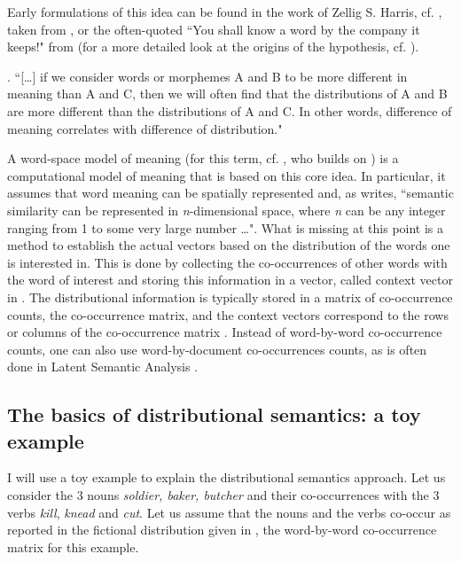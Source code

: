 Early formulations of this idea can be found in the work of Zellig
S. Harris, cf. \Next, taken from \citet{Harris:1954}, or the
often-quoted 
``You shall know a word by the company it keeps!" from
\citet[11]{Firth:1957b} (for a more detailed look at the origins of the
hypothesis, cf. \citealt{Sahlgren:2006,Sahlgren:2008}).

\ex. ``[\dots] if we consider words or morphemes A and B to be more different in
meaning than A and C, then we will often find that the distributions
of A and B are more different than the distributions of A and C.
In other words, difference of meaning correlates with difference of
distribution." %

A word-space model of meaning (for this term,
cf. \citealt[17]{Sahlgren:2006}, who builds on \citealt{Schuetze:1993}) is a computational model of meaning that is
based on this core idea. In particular, it assumes that word meaning
can be spatially represented and, as \citet[18]{Sahlgren:2006}
writes, ``semantic similarity can be represented in
\emph{n}-dimensional space, where \emph{n} can be any integer ranging
from 1 to some very large number \dots". What is missing at this point
is a method to establish the actual vectors based on the distribution
of the words one is interested in. This is done by collecting the
co-occurrences of other words with the word of interest and storing
this information in a vector, called context vector in
\citet[27]{Sahlgren:2006}. The distributional information is typically
stored in a matrix of co-occurrence counts, the co-occurrence matrix,
and the context vectors correspond to the rows or columns of the
co-occurrence matrix \citep[31]{Sahlgren:2006}. Instead of word-by-word co-occurrence counts, one can also use word-by-document co-occurrences counts, as is often done in Latent Semantic Analysis \citep{Dumais:2005}.

\subsection{The basics of distributional semantics: a toy example}
\label{sec:toy-example}

I will use a toy example to explain the distributional semantics approach.
Let us consider the 3 nouns \emph{soldier, baker, butcher} and
their co-occurrences with the 3 verbs
\emph{kill}, \emph{knead} and \emph{cut}. Let us assume that the nouns and the
verbs co-occur as reported in the fictional distribution given in
, the word-by-word
co-occurrence matrix for this example.



